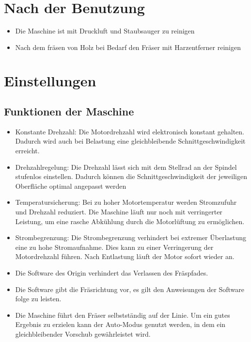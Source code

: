\documentclass{\basedir/fablab-document}
\begin{document}
\section{Nach der Benutzung}
\begin{itemize}
\item Die Maschine ist mit Druckluft und Staubsauger zu reinigen
\item Nach dem fräsen von Holz bei Bedarf den Fräser mit Harzentferner reinigen
\end{itemize}

\section{Einstellungen}
\subsection{Funktionen der Maschine}
\begin{itemize}
\item Konstante Drehzahl: Die Motordrehzahl wird elektronisch konstant gehalten. Dadurch wird auch bei Belastung eine gleichbleibende Schnittgeschwindigkeit erreicht.
\item Drehzahlregelung: Die Drehzahl lässt sich mit dem Stellrad an der Spindel stufenlos einstellen. Dadurch können die Schnittgeschwindigkeit der jeweiligen Oberfläche optimal angepasst werden
\item Temperatursicherung: Bei zu hoher Motortemperatur werden Stromzufuhr und Drehzahl reduziert. Die Maschine läuft nur noch mit verringerter Leistung, um eine rasche Abkühlung durch die Motorlüftung zu ermöglichen. 
\item Strombegrenzung: Die Strombegrenzung verhindert bei extremer Überlastung eine zu hohe Stromaufnahme. Dies kann zu einer Verringerung der Motordrehzahl führen. Nach Entlastung läuft der Motor sofort wieder an.
\item Die Software des Origin verhindert das Verlassen des Fräspfades.
\item Die Software gibt die Fräsrichtung vor, es gilt den Anweisungen der Software folge zu leisten.
\item Die Maschine führt den Fräser selbstständig auf der Linie. Um ein gutes Ergebnis zu erzielen kann der Auto-Modus genutzt werden, in dem ein gleichbleibender Vorschub gewährleistet wird.
\end{itemize}
\end{document}
